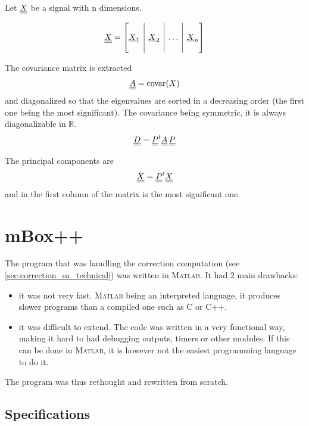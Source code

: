 Let $\underline{\underline{X}}$ be a signal with n dimensions.

\begin{equation}
\mat{X} = \left[
\begin{array}{@{}c|c|c|c@{}}
&&&\\ \vec{X}_1 & \vec{X}_2 & \dots & \vec{X}_n \\ &&&
\end{array}
\right]
\end{equation}

The covariance matrix is extracted
\begin{equation}
\underline{\underline{A}} = \text{covar}(X)
\end{equation}
and diagonalized so that the eigenvalues are sorted in a decreasing order (the first one being the most significant). The covariance being symmetric, it is always diagonalizable in $\mathbb{R}$.
\begin{equation}
\underline{\underline{D}} = \underline{\underline{P}}^{t} \underline{\underline{A}} \, \underline{\underline{P}}
\end{equation}

The principal components are
\begin{equation}
\hat{\underline{\underline{X}}} = \underline{\underline{P}}^{t} \underline{\underline{X}}
\end{equation}
and in the first column of the matrix is the most significant one.

\chapter{mBox++}
\label{apx:mbox}
The program that was handling the correction computation (see \cref{sec:correction_sa_technical}) was written in \textsc{Matlab}. It had 2 main drawbacks:
\begin{itemize}
    \item it was not very fast. \textsc{Matlab} being an interpreted language, it produces slower programs than a compiled one such as C or C++.
    \item it was difficult to extend. The code was written in a very functional way, making it hard to had debugging outputs, timers or other modules. If this can be done in \textsc{Matlab}, it is however not the easiest programming language to do it.
\end{itemize}

The program was thus rethought and rewritten from scratch.

\section{Specifications}

